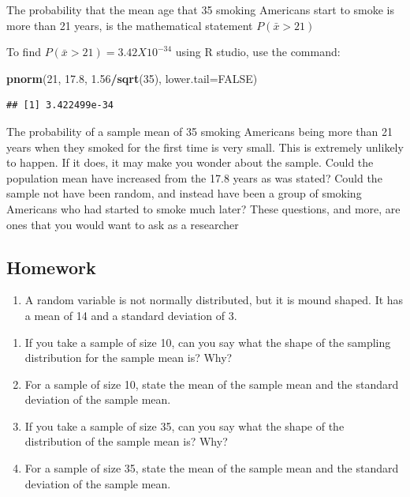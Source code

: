 \documentclass[
]{book}
\newenvironment{Shaded}{\begin{snugshade}}{\end{snugshade}}
\newcommand{\DataTypeTok}[1]{\textcolor[rgb]{0.13,0.29,0.53}{#1}}
\newcommand{\DecValTok}[1]{\textcolor[rgb]{0.00,0.00,0.81}{#1}}
\newcommand{\FloatTok}[1]{\textcolor[rgb]{0.00,0.00,0.81}{#1}}
\newcommand{\KeywordTok}[1]{\textcolor[rgb]{0.13,0.29,0.53}{\textbf{#1}}}
\newcommand{\NormalTok}[1]{#1}
\newcommand{\OperatorTok}[1]{\textcolor[rgb]{0.81,0.36,0.00}{\textbf{#1}}}
\newcommand{\OtherTok}[1]{\textcolor[rgb]{0.56,0.35,0.01}{#1}}
\providecommand{\tightlist}{%
  \setlength{\itemsep}{0pt}\setlength{\parskip}{0pt}}
\begin{document}
The probability that the mean age that 35 smoking Americans start to smoke is more than 21 years, is the mathematical statement \(P(\bar{x}>21)\)

To find \(P(\bar{x}>21)= 3.42X10^{-34}\) using R studio, use the command:

\begin{Shaded}
\begin{Highlighting}[]
\KeywordTok{pnorm}\NormalTok{(}\DecValTok{21}\NormalTok{, }\FloatTok{17.8}\NormalTok{, }\FloatTok{1.56}\OperatorTok{/}\KeywordTok{sqrt}\NormalTok{(}\DecValTok{35}\NormalTok{), }\DataTypeTok{lower.tail=}\OtherTok{FALSE}\NormalTok{)}
\end{Highlighting}
\end{Shaded}

\begin{verbatim}
## [1] 3.422499e-34
\end{verbatim}

The probability of a sample mean of 35 smoking Americans being more than 21 years when they smoked for the first time is very small. This is extremely unlikely to happen. If it does, it may make you wonder about the sample. Could the population mean have increased from the 17.8 years as was stated? Could the sample not have been random, and instead have been a group of smoking Americans who had started to smoke much later? These questions, and more, are ones that you would want to ask as a researcher

\hypertarget{homework-2}{%
\subsection{Homework}\label{homework-2}}

\begin{enumerate}
\def\labelenumi{\arabic{enumi}.}
\tightlist
\item
  A random variable is not normally distributed, but it is mound shaped. It has a mean of 14 and a standard deviation of 3.
\end{enumerate}

\begin{enumerate}
\def\labelenumi{\alph{enumi}.}
\tightlist
\item
  If you take a sample of size 10, can you say what the shape of the sampling distribution for the sample mean is? Why?
\item
  For a sample of size 10, state the mean of the sample mean and the standard deviation of the sample mean.
\item
  If you take a sample of size 35, can you say what the shape of the distribution of the sample mean is? Why?
\item
  For a sample of size 35, state the mean of the sample mean and the standard deviation of the sample mean.
\end{enumerate}
\end{document}
